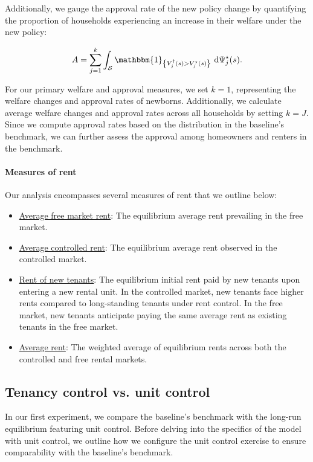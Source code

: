 \documentclass[parskip=full]{article}
\newcommand{\indicator}[1]{\mathbbm{1}_{\left\{ {#1} \right\} }}
\begin{document}
Additionally, we gauge the approval rate of the new policy change by quantifying the proportion of households experiencing an increase in their welfare under the new policy:

\begin{equation}
A = \sum_{j=1}^{k}\int_{\mathcal{S}} \indicator{V^{\dagger}_{j}(s)>V^{\star}_{j}(s)}\ \mathrm{d}\Psi^{\star}_{j}(s).
\end{equation}

\noindent For our primary welfare and approval measures, we set $k=1$, representing the welfare changes and approval rates of newborns. Additionally, we calculate average welfare changes and approval rates across all households by setting $k=J$. Since we compute approval rates based on the distribution in the baseline's benchmark, we can further assess the approval among homeowners and renters in the benchmark.


\paragraph{Measures of rent} Our analysis encompasses several measures of rent that we outline below:

\begin{itemize}
    \item \underline{Average free market rent}: The equilibrium average rent prevailing in the free market.
    \item \underline{Average controlled rent}: The equilibrium average rent observed in the controlled market.
    \item \underline{Rent of new tenants}: The equilibrium initial rent paid by new tenants upon entering a new rental unit. In the controlled market, new tenants face higher rents compared to long-standing tenants under rent control. In the free market, new tenants anticipate paying the same average rent as existing tenants in the free market.
    \item \underline{Average rent}: The weighted average of equilibrium rents across both the controlled and free rental markets.
\end{itemize}

\subsection{Tenancy control vs. unit control}

In our first experiment, we compare the baseline's benchmark with the long-run equilibrium featuring unit control. Before delving into the specifics of the model with unit control, we outline how we configure the unit control exercise to ensure comparability with the baseline's benchmark.
\end{document}
